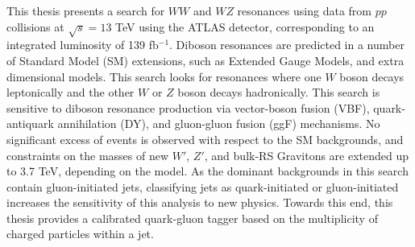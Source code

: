 This thesis presents a search for $WW$ and $WZ$ resonances using data from $pp$ collisions at $\sqrt{s}=13$ TeV using the ATLAS detector, corresponding to an integrated luminosity of 139 fb$^{-1}$. Diboson resonances are predicted in a number of Standard Model (SM) extensions, such as Extended Gauge Models, and extra dimensional models. This search looks for resonances where one $W$ boson decays leptonically and the other $W$ or $Z$ boson decays hadronically. This search is sensitive to diboson resonance production via vector-boson fusion (VBF), quark-antiquark annihilation (DY), and gluon-gluon fusion (ggF) mechanisms. No significant excess of events is observed with respect to the SM backgrounds, and constraints on the masses of new $W'$, $Z'$, and bulk-RS Gravitons are extended up to 3.7 TeV, depending on the model. As the dominant backgrounds in this search contain gluon-initiated jets, classifying jets as quark-initiated or gluon-initiated increases the sensitivity of this analysis to new physics. Towards this end, this thesis provides a calibrated quark-gluon tagger based on the multiplicity of charged particles within a jet.